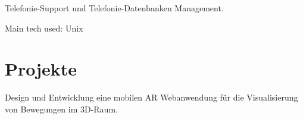 \documentclass[a4paper]{deedy-resume_twopage} %
\begin{document}
\begin{minipage}[t]{0.66\textwidth}
  \begin{tightitemize}
  \item Telefonie-Support und Telefonie-Datenbanken Management.
  \end{tightitemize}
  Main tech used: \textbullet{} Unix

  \sectionspace %



  \section{Projekte}


  Design und Entwicklung eine mobilen AR Webanwendung für die Visualisierung von Bewegungen im 3D-Raum.


\end{minipage}
\end{document}
